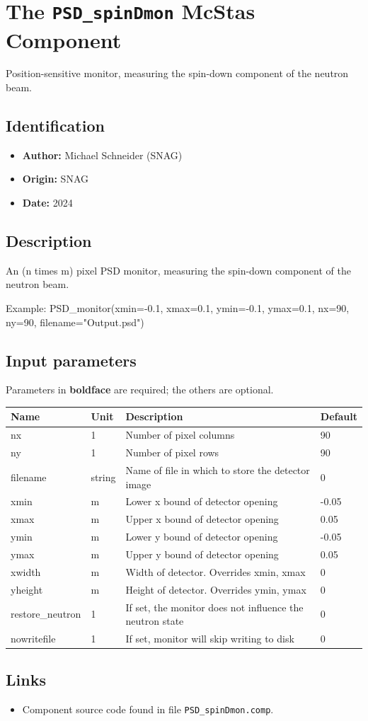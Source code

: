 \section{The \texttt{PSD\_spinDmon} McStas Component}
Position-sensitive monitor, measuring the spin-down component of the neutron beam.

\subsection*{Identification}
\begin{itemize}
  \item \textbf{Author:} Michael Schneider (SNAG)
  \item \textbf{Origin:} SNAG
  \item \textbf{Date:} 2024
\end{itemize}

\subsection*{Description}
An (n times m) pixel PSD monitor, measuring the spin-down component of the neutron beam.

Example: PSD\_monitor(xmin=-0.1, xmax=0.1, ymin=-0.1, ymax=0.1, nx=90, ny=90, filename="Output.psd")

\subsection*{Input parameters}
Parameters in \textbf{boldface} are required; the others are optional.

\begin{longtable}{p{}p{}p{}p{}}
\toprule
\textbf{Name} & \textbf{Unit} & \textbf{Description} & \textbf{Default} \\
\midrule
\endhead
nx & 1 & Number of pixel columns & 90 \\
ny & 1 & Number of pixel rows & 90 \\
filename & string & Name of file in which to store the detector image & 0 \\
xmin & m & Lower x bound of detector opening & -0.05 \\
xmax & m & Upper x bound of detector opening & 0.05 \\
ymin & m & Lower y bound of detector opening & -0.05 \\
ymax & m & Upper y bound of detector opening & 0.05 \\
xwidth & m & Width of detector. Overrides xmin, xmax & 0 \\
yheight & m & Height of detector. Overrides ymin, ymax & 0 \\
restore\_neutron & 1 & If set, the monitor does not influence the neutron state & 0 \\
nowritefile & 1 & If set, monitor will skip writing to disk & 0 \\
\bottomrule
\end{longtable}

\subsection*{Links}
\begin{itemize}
  \item Component source code found in file \texttt{PSD\_spinDmon.comp}.
\end{itemize}
